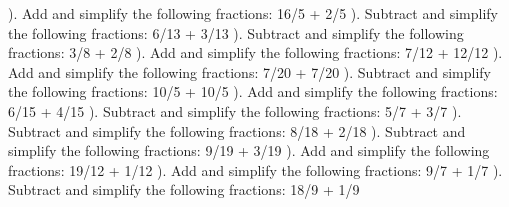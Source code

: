 \documentclass{article}%
\begin{document}
). Add and simplify the following fractions: 16/5 + 2/5%
\newline%
\newline%
). Subtract and simplify the following fractions: 6/13 + 3/13%
\newline%
\newline%
). Subtract and simplify the following fractions: 3/8 + 2/8%
\newline%
\newline%
). Add and simplify the following fractions: 7/12 + 12/12%
\newline%
\newline%
). Add and simplify the following fractions: 7/20 + 7/20%
\newline%
\newline%
). Subtract and simplify the following fractions: 10/5 + 10/5%
\newline%
\newline%
). Add and simplify the following fractions: 6/15 + 4/15%
\newline%
\newline%
). Subtract and simplify the following fractions: 5/7 + 3/7%
\newline%
\newline%
). Subtract and simplify the following fractions: 8/18 + 2/18%
\newline%
\newline%
). Subtract and simplify the following fractions: 9/19 + 3/19%
\newline%
\newline%
). Add and simplify the following fractions: 19/12 + 1/12%
\newline%
\newline%
). Add and simplify the following fractions: 9/7 + 1/7%
\newline%
\newline%
). Subtract and simplify the following fractions: 18/9 + 1/9%
\end{document}
